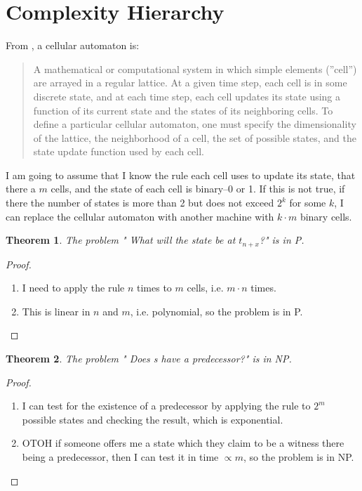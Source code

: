 \documentclass[]{article}
\newtheorem{thm}{Theorem}
\begin{document}
\section{Complexity Hierarchy}

From \cite{sfi2020glossary}, a cellular automaton is: \begin{quotation}
	A mathematical or computational system in which simple elements (''cell'') are arrayed in a regular lattice. At a given time step, each cell is in some discrete state, and at each time step, each cell updates its state using a function of its current state and the states of its neighboring cells. To define a particular cellular automaton, one must specify the dimensionality of the lattice, the neighborhood of a cell, the set of possible states, and the state update function used by each cell. 
\end{quotation}
I am going to assume that I know the rule each cell uses to update its state, that there a $m$ cells, and the state of each cell is binary--0 or 1. If this is not true, if there the number of states is more than 2 but does not exceed $2^k$ for some $k$, I can replace the cellular automaton with another machine with $k\cdot m$ binary cells. 

\begin{thm}
	The problem " What will the state be at $t_{n+x}$?" is in P.
\end{thm}

\begin{proof}
	
	\begin{enumerate}
		\item I need to apply the rule $n$ times to $m$ cells, i.e. $m \cdot n$ times. \item This is linear in $n$ and $m$, i.e. polynomial, so the problem is in P. 
	\end{enumerate}
\end{proof}


\begin{thm}
	The problem " Does s have a predecessor?" is in NP.
\end{thm}

\begin{proof}
		\begin{enumerate}
		\item I can test for the existence of a predecessor by applying the rule to $2^m$ possible states and checking the result, which is exponential.
		\item OTOH if someone offers me a state which they claim to be a witness there being a predecessor, then I can test it in time $\propto m$, so the problem is in NP. 
	\end{enumerate}
\end{proof}
\end{document}
